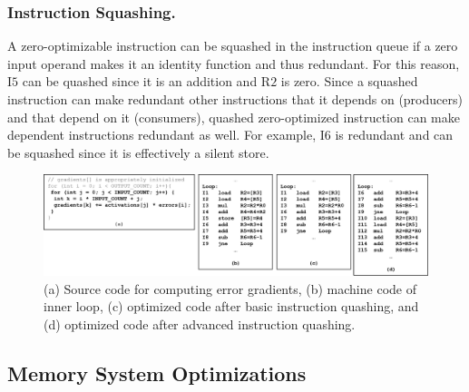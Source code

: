 \subsubsection{Instruction Squashing.} A zero-optimizable instruction can be squashed in the instruction queue if a zero input operand makes it an identity function and thus redundant. For this reason, I$5$ can be quashed since it is an addition and R$2$ is zero. Since a squashed instruction can make redundant other instructions that it depends on (producers) and that depend on it (consumers),  quashed zero-optimized instruction can make dependent instructions redundant as well.  For example, I$6$ is redundant and can be squashed since it is effectively a silent store. 
 

\begin{figure}
\centering
\includegraphics[width=1.9\columnwidth]{Figures/gradient_code_opt.png}
\caption{(a) Source code for computing error gradients, (b) machine code of inner loop, (c) optimized code after basic instruction quashing, and (d) optimized code after advanced instruction quashing.}
\label{fig:gradient_code}
\end{figure}


\subsection{Memory System Optimizations}


 
 
